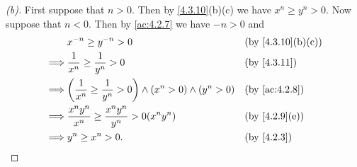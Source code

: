 \begin{proof}[(b)]
  First suppose that \(n > 0\).
  Then by \cref{4.3.10}(b)(c) we have \(x^n \geq y^n > 0\).
  Now suppose that \(n < 0\).
  Then by \cref{ac:4.2.7} we have \(-n > 0\) and
  \begin{align*}
             & x^{-n} \geq y^{-n} > 0                                                      &  & \by{4.3.10}[b,c] \\
    \implies & \dfrac{1}{x^n} \geq \dfrac{1}{y^n} > 0                                      &  & \by{4.3.11}      \\
    \implies & \pa{\dfrac{1}{x^n} \geq \dfrac{1}{y^n} > 0} \land (x^n > 0) \land (y^n > 0) &  & \by{ac:4.2.8}    \\
    \implies & \dfrac{x^n y^n}{x^n} \geq \dfrac{x^n y^n}{y^n} > 0(x^n y^n)                 &  & \by{4.2.9}[e]    \\
    \implies & y^n \geq x^n > 0.                                                           &  & \by{4.2.3}
  \end{align*}
\end{proof}

